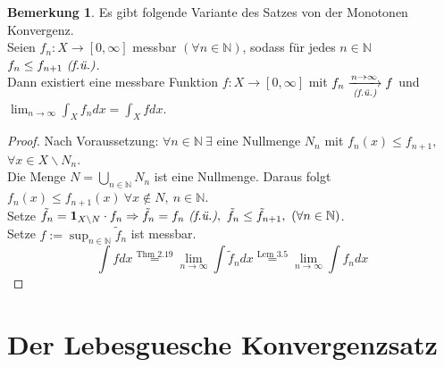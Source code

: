 \documentclass[a4paper]{scrreprt}
\newcommand{\doubleOne}{\textbf{1}}
\newcommand{\N}{\mathbb{N}}
\newcommand{\toInf}{\rightarrow \infty}
\newcommand{\limToInf}[1]{\lim_{#1 \toInf}}
\newcommand{\jlabel}[1]{\label{j_#1}}
\newcommand{\jshortlink}[1]{\jhyperref{#1}{\text{#1}}}
\newcommand{\jhyperref}[2]{\hyperref[j_#1]{#2}}
\newcommand{\fu}{\text{\textit{(f.ü.)}}}
\newcommand{\jabb}[3]{ #1: #2 \rightarrow #3 }
\theoremstyle{plain}
\theoremstyle{definition}
\newtheorem{bem}[thm]{Bemerkung}
\begin{document}
{{{{\begin{bem}
\jlabel{Bem 3.8}
    Es gibt folgende Variante des Satzes von der Monotonen Konvergenz.\\
    Seien $\jabb{f_n}{X}{[0,\infty]}$ messbar $(\forall n\in\N)$, sodass für jedes $n\in \N$ $f_n \le f_{n+1} \ \fu$.\\
    Dann existiert eine messbare Funktion $\jabb{f}{X}{[0,\infty]}$ mit $f_n \underset{\fu}{\xrightarrow{n\rightarrow \infty}} f$ und $\limToInf{n} \int_X f_n dx = \int_X f dx$.
    \begin{proof}
        Nach Voraussetzung: $\forall n\in\N \ \exists$ eine Nullmenge $N_n$ mit $f_n(x) \le f_{n+1},$ $\forall x \in X\backslash N_n$.\\
        Die Menge $N=\bigcup_{n\in\N} N_n$ ist eine Nullmenge. Daraus folgt $f_n(x) \le f_{n+1}(x) \ \forall x\notin N, \ n\in\N$.\\
        Setze $\tilde{f}_n = \doubleOne_{X\backslash N} \cdot f_n \Rightarrow \tilde{f}_n = f_n \ \fu, \ \tilde{f}_n \le \tilde{f}_{n+1}, \ (\forall n\in\N)$.\\
        Setze $f := \sup_{n\in\N} \tilde{f}_n$ ist messbar.
        \begin{displaymath}
            \int f dx \overset{\jshortlink{Thm 2.19}}{=} \limToInf{n} \int \tilde{f}_n dx \overset{\jshortlink{Lem 3.5}}{=} \limToInf{n} \int f_n dx
        \end{displaymath}
    \end{proof}
\end{bem}
    
\section{Der Lebesguesche Konvergenzsatz}

}}}}
\end{document}

